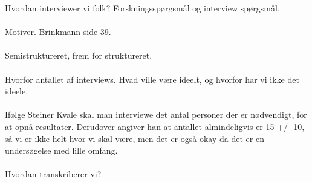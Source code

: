 Hvordan interviewer vi folk? Forskningsspørgsmål og interview spørgsmål.
\\
\\
Motiver. Brinkmann side 39.
\\
\\
Semistruktureret, frem for struktureret.
\\
\\
Hvorfor antallet af interviews. Hvad ville være ideelt, og hvorfor har vi ikke det ideele.
\\
\\
Ifølge Steiner Kvale skal man interviewe det antal personer der er nødvendigt, for at opnå resultater. Derudover angiver han at antallet almindeligvis er 15 +/- 10, så vi er ikke helt hvor vi skal være, men det er også okay da det er en undersøgelse med lille omfang.
\cite{kvale2015}
\\
\\
Hvordan transkriberer vi?
\\





